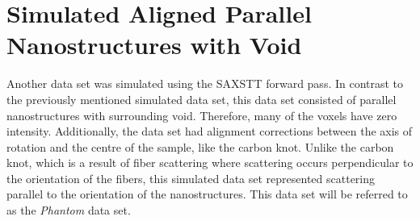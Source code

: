 \section{Simulated Aligned Parallel Nanostructures with Void}
\label{sec:aligned_parallel_nanostructures_in_air}
Another data set was simulated using the SAXSTT forward pass. In contrast to the previously mentioned simulated data set,
this data set consisted of parallel nanostructures with surrounding void. Therefore, many of the voxels have zero intensity.
Additionally, the data set had alignment corrections between the axis of rotation and the centre of the sample, like the carbon knot.
Unlike the carbon knot, which is a result of fiber scattering where scattering occurs perpendicular to the orientation of the fibers,
this simulated data set represented scattering parallel to the orientation of the nanostructures.
This data set will be referred to as the \emph{Phantom} data set.


